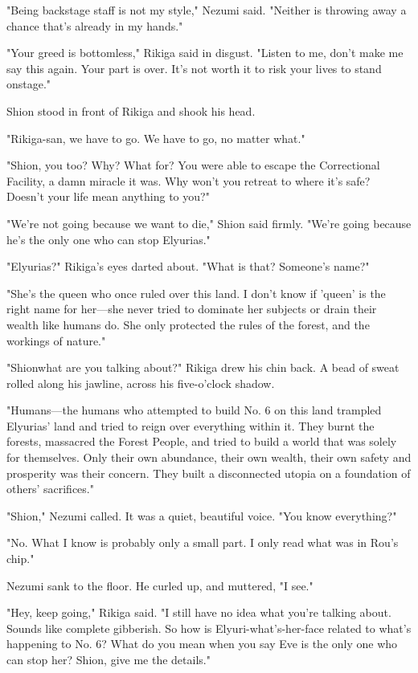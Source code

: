 "Being backstage staff is not my style," Nezumi said. "Neither is
throwing away a chance that's already in my hands."

"Your greed is bottomless," Rikiga said in disgust. "Listen to me, don't
make me say this again. Your part is over. It's not worth it to risk
your lives to stand onstage."

Shion stood in front of Rikiga and shook his head.

"Rikiga-san, we have to go. We have to go, no matter what."

"Shion, you too? Why? What for? You were able to escape the Correctional
Facility, a damn miracle it was. Why won't you retreat to where it's
safe? Doesn't your life mean anything to you?"

"We're not going because we want to die," Shion said firmly. "We're
going because he's the only one who can stop Elyurias."

"Elyurias?" Rikiga's eyes darted about. "What is that? Someone's name?"

"She's the queen who once ruled over this land. I don't know if 'queen'
is the right name for her---she never tried to dominate her subjects or
drain their wealth like humans do. She only protected the rules of the
forest, and the workings of nature."

"Shion\el what are you talking about?" Rikiga drew his chin back. A bead
of sweat rolled along his jawline, across his five-o'clock shadow.

"Humans---the humans who attempted to build No. 6 on this land trampled
Elyurias' land and tried to reign over everything within it. They burnt
the forests, massacred the Forest People, and tried to build a world
that was solely for themselves. Only their own abundance, their own
wealth, their own safety and prosperity was their concern. They built a
disconnected utopia on a foundation of others' sacrifices."

"Shion," Nezumi called. It was a quiet, beautiful voice. "You know
everything?"

"No. What I know is probably only a small part. I only read what was in
Rou's chip."

Nezumi sank to the floor. He curled up, and muttered, "I see."

"Hey, keep going," Rikiga said. "I still have no idea what you're
talking about. Sounds like complete gibberish. So how is
Elyuri-what's-her-face related to what's happening to No. 6? What do you
mean when you say Eve is the only one who can stop her? Shion, give me
the details."

